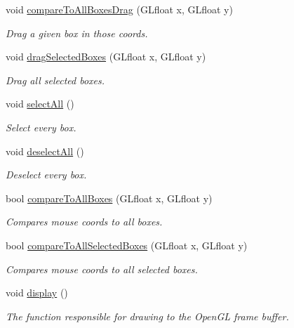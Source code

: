\begin{DoxyCompactItemize}
void \hyperlink{class_graphics_engine_a2cccf1122d2083c4064dedcba89aa994}{compare\+To\+All\+Boxes\+Drag} (G\+Lfloat x, G\+Lfloat y)
\begin{DoxyCompactList}\small\item\em Drag a given box in those coords. \end{DoxyCompactList}\item 
void \hyperlink{class_graphics_engine_ae10f5983900c72c2997ed6665bb245be}{drag\+Selected\+Boxes} (G\+Lfloat x, G\+Lfloat y)
\begin{DoxyCompactList}\small\item\em Drag all selected boxes. \end{DoxyCompactList}\item 
void \hyperlink{class_graphics_engine_a926e151acd90fc95722d740c4cd02995}{select\+All} ()
\begin{DoxyCompactList}\small\item\em Select every box. \end{DoxyCompactList}\item 
void \hyperlink{class_graphics_engine_aa786a083387002aa1445026627a51b0a}{deselect\+All} ()
\begin{DoxyCompactList}\small\item\em Deselect every box. \end{DoxyCompactList}\item 
bool \hyperlink{class_graphics_engine_a4a2634a2624f603abf53b3b2746ba8c6}{compare\+To\+All\+Boxes} (G\+Lfloat x, G\+Lfloat y)
\begin{DoxyCompactList}\small\item\em Compares mouse coords to all boxes. \end{DoxyCompactList}\item 
bool \hyperlink{class_graphics_engine_a683606dd2698ae7a7fbcc892ff4a54ba}{compare\+To\+All\+Selected\+Boxes} (G\+Lfloat x, G\+Lfloat y)
\begin{DoxyCompactList}\small\item\em Compares mouse coords to all selected boxes. \end{DoxyCompactList}\item 
void \hyperlink{class_graphics_engine_a2f0bdf1a47bf9e8d4f1c9525c2ebc8f9}{display} ()
\begin{DoxyCompactList}\small\item\em The function responsible for drawing to the Open\+GL frame buffer. \end{DoxyCompactList}\item 

\end{DoxyCompactItemize}
